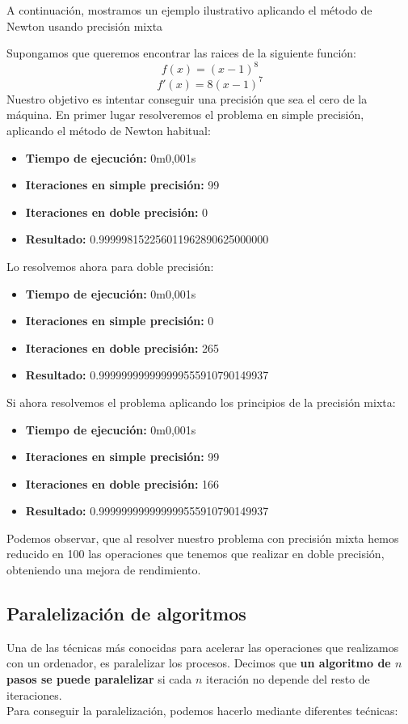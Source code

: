 A continuación, mostramos un ejemplo ilustrativo aplicando el método de Newton usando precisión mixta
\begin{ejemplo}
	Supongamos que queremos encontrar las raices de la siguiente función:
	\[
		f(x) = (x-1)^8
	\]
	\[
		f'(x) = 8 (x-1)^7
	\]
	Nuestro objetivo es intentar conseguir una precisión que sea el cero de la máquina. En primer lugar resolveremos el problema en simple precisión, aplicando el método de Newton habitual:
	\begin{itemize}
		\item \textbf{Tiempo de ejecución: } 0m0,001s
		\item \textbf{Iteraciones en simple precisión: } 99
		\item \textbf{Iteraciones en doble precisión: } 0
		\item \textbf{Resultado: } 0.999998152256011962890625000000
	\end{itemize}

	Lo resolvemos ahora para doble precisión:
	\begin{itemize}
		\item \textbf{Tiempo de ejecución: } 0m0,001s
		\item \textbf{Iteraciones en simple precisión: } 0
		\item \textbf{Iteraciones en doble precisión: } 265
		\item \textbf{Resultado: } 0.999999999999999555910790149937
	\end{itemize}

	Si ahora resolvemos el problema aplicando los principios de la precisión mixta:
	\begin{itemize}
		\item \textbf{Tiempo de ejecución: } 0m0,001s
		\item \textbf{Iteraciones en simple precisión: } 99
		\item \textbf{Iteraciones en doble precisión: } 166
		\item \textbf{Resultado: } 0.999999999999999555910790149937
	\end{itemize}

	Podemos observar, que al resolver nuestro problema con precisión mixta hemos reducido en 100 las operaciones que tenemos que realizar en doble precisión, obteniendo una mejora de rendimiento.
\end{ejemplo}

\subsection{Paralelización de algoritmos}
Una de las técnicas más conocidas para acelerar las operaciones que realizamos con un ordenador, es paralelizar los procesos.  Decimos que \textbf{un algoritmo de $n$ pasos se puede paralelizar} si cada $n$ iteración no depende del resto de iteraciones. \\
Para conseguir la paralelización, podemos hacerlo mediante diferentes tećnicas:


